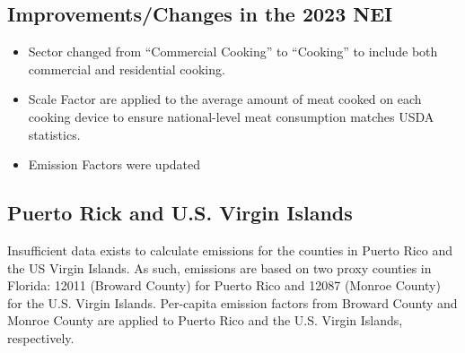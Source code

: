 \documentclass[
  11pt,
  oneside]{book}
\providecommand{\tightlist}{%
  \setlength{\itemsep}{0pt}\setlength{\parskip}{0pt}}
\begin{document}
\begin{table}
\centering
\caption{\label{tab:cooking-sample-calculations}Sample Calculations}
\centering
{}
\end{table}

\subsection{Improvements/Changes in the 2023 NEI}\label{improvementschanges-in-the-2023-nei}

\begin{itemize}
\tightlist
\item
  Sector changed from ``Commercial Cooking'' to ``Cooking'' to include both commercial and residential cooking.
\item
  Scale Factor are applied to the average amount of meat cooked on each cooking device to ensure national-level meat consumption matches USDA statistics.
\item
  Emission Factors were updated
\end{itemize}

\subsection{Puerto Rick and U.S. Virgin Islands}\label{puerto-rick-and-u.s.-virgin-islands}

Insufficient data exists to calculate emissions for the counties in Puerto Rico and the US Virgin Islands. As such, emissions are based on two proxy counties in Florida: 12011 (Broward County) for Puerto Rico and 12087 (Monroe County) for the U.S. Virgin Islands. Per-capita emission factors from Broward County and Monroe County are applied to Puerto Rico and the U.S. Virgin Islands, respectively.
\end{document}
